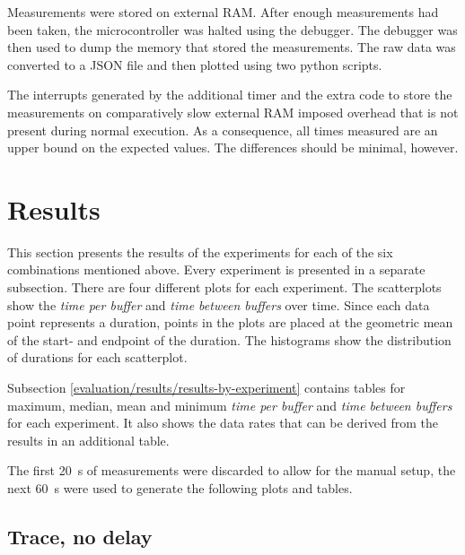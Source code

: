 Measurements were stored on external RAM. After enough measurements had been taken, the microcontroller
was halted using the debugger. The debugger was then used to dump the memory that stored the
measurements. The raw data was converted to a JSON file and then plotted using two python scripts.

The interrupts generated by the additional timer and the extra code to store the measurements on
comparatively slow external RAM imposed overhead that is not present during normal execution. As a
consequence, all times measured are an upper bound on the expected values. The differences should be
minimal, however.

\section{Results}
\label{evaluation/results}

This section presents the results of the experiments for each of the six combinations mentioned
above. Every experiment is presented in a separate subsection. There are four different plots
for each experiment. The scatterplots show the \textit{time per buffer} and
\textit{time between buffers} over time. Since each data point represents a duration, points in the
plots are placed at the geometric mean of the start- and endpoint of the duration. The histograms
show the distribution of durations for each scatterplot.

Subsection \ref{evaluation/results/results-by-experiment} contains tables for maximum, median, mean
and minimum \textit{time per buffer} and \textit{time between buffers} for each experiment. It also
shows the data rates that can be derived from the results in an additional table.

The first \SI{20}{\second} of measurements were discarded to allow for the manual setup, the next
\SI{60}{\second} were used to generate the following plots and tables.

\clearpage
\subsection{Trace, no delay}
\label{evaluation/results/trace-no-delay}

